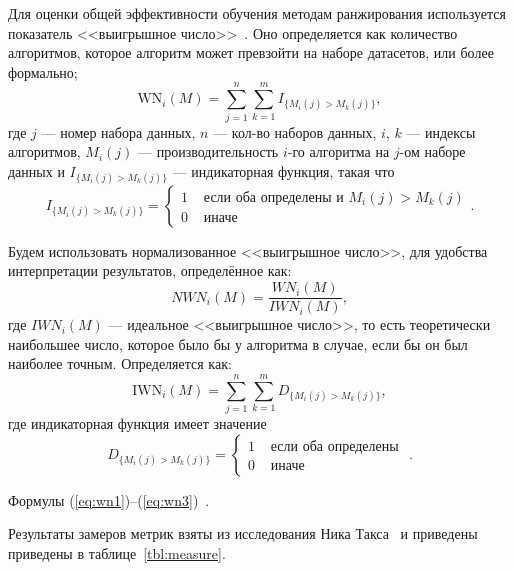Для оценки общей эффективности обучения методам ранжирования используется показатель <<выигрышное число>>~\cite{cmp}. Оно определяется как количество алгоритмов, которое алгоритм может превзойти на наборе датасетов, или более формально;
\begin{equation}
	\label{eq:wn1}
	\mathrm{WN}_i(M)=\sum_{j=1}^n \sum_{k=1}^m I_{\{M_i(j)>M_k(j)\}},
\end{equation}
где $j$ --- номер набора данных, $n$ --- кол-во наборов данных, $i$, $k$ --- индексы алгоритмов, $M_i(j)$ --- производительность $i$-го алгоритма на $j$-ом наборе данных и $I_{\{M_i(j)>M_k(j)\}}$ --- индикаторная функция, такая что
\[
I_{\{M_i(j)>M_k(j)\}}= \begin{cases}1 & \text { если оба определены и } M_i(j)>M_k(j) \\ 0 & \text { иначе }\end{cases}.
\]

Будем использовать нормализованное <<выигрышное число>>, для удобства интерпретации результатов, определённое как:
\begin{equation}
	\label{eq:wn2}
	NWN_i(M)=\frac{WN_i(M)}{IWN_i(M)},
\end{equation}
где $IWN_i(M)$ --- идеальное <<выигрышное число>>, то есть теоретически наибольшее число, которое было
бы у алгоритма в случае, если бы он был наиболее точным. Определяется как:
\begin{equation}
	\label{eq:wn3}
	\mathrm{IWN}_i(M)=\sum_{j=1}^n \sum_{k=1}^m D_{\{M_i(j)>M_k(j)\}},
\end{equation}
где индикаторная функция имеет значение
\[
D_{\{M_i(j)>M_k(j)\}}= \begin{cases}1 & \text { если оба определены } \\ 0 & \text { иначе }\end{cases}.
\]

Формулы (\ref{eq:wn1})--(\ref{eq:wn3})~\cite{cmp}.

Результаты замеров метрик взяты из исследования Ника Такса~\cite{cmp} и приведены приведены в таблице~\ref{tbl:measure}.

